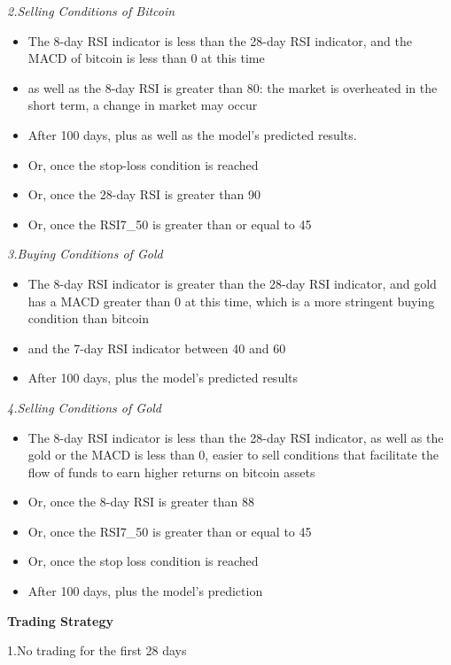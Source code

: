 \documentclass[12pt]{article}
\begin{document}
    \textit{2.Selling Conditions of Bitcoin}
    \begin{itemize}
        \item The 8-day RSI indicator is less than the 28-day RSI indicator, and the MACD of bitcoin is less than 0 at this time
        \item as well as the 8-day RSI is greater than 80: the market is overheated in the short term, a change in market may occur
        \item After 100 days, plus as well as the model's predicted results.
        \item Or, once the stop-loss condition is reached
        \item Or, once the 28-day RSI is greater than 90
        \item Or, once the RSI7\_50 is greater than or equal to 45
    \end{itemize}
    
    \textit{3.Buying Conditions of Gold}
    \begin{itemize}
        \item The 8-day RSI indicator is greater than the 28-day RSI indicator, and gold has a MACD greater than 0 at this time, which is a more stringent buying condition than bitcoin
        \item and the 7-day RSI indicator between 40 and 60
        \item After 100 days, plus the model's predicted results
    \end{itemize}
    
    \textit{4.Selling Conditions of Gold}
    \begin{itemize}
        \item The 8-day RSI indicator is less than the 28-day RSI indicator, as well as the gold or the MACD is less than 0, easier to sell conditions that facilitate the flow of funds to earn higher returns on bitcoin assets
        \item Or, once the 8-day RSI is greater than 88
        \item Or, once the RSI7\_50 is greater than or equal to 45
        \item Or, once the stop loss condition is reached
        \item After 100 days, plus the model's prediction
    \end{itemize}
    
    \noindent\textbf{Trading Strategy}
    
    1.No trading for the first 28 days
    
\end{document}
